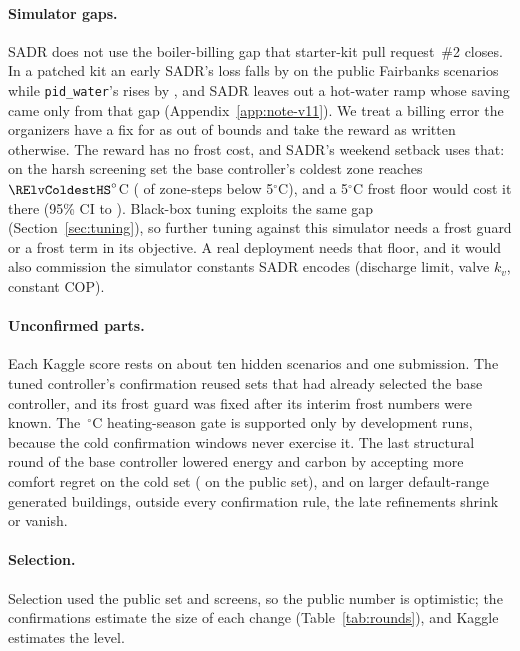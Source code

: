\paragraph{Simulator gaps.} SADR does not use the boiler-billing gap that starter-kit pull request~\#2 closes. In a patched kit an early SADR's loss falls by \RFivePrTwoVSevenRelAbs{} on the \RFivePrTwoVSevenN{} public Fairbanks scenarios while \texttt{pid\_water}'s rises by \RFivePrTwoPidRelAbs, and SADR leaves out a hot-water ramp whose saving came only from that gap (Appendix~\ref{app:note-v11}). We treat a billing error the organizers have a fix for as out of bounds and take the reward as written otherwise. The reward has no frost cost, and SADR's weekend setback uses that: on the harsh screening set the base controller's coldest zone reaches $\RElvColdestHS^\circ$C (\RElvBelowFiveHS{} of zone-steps below 5$^\circ$C), and a 5$^\circ$C frost floor would cost it \RElvFrostHsRel{} there (95\% CI \RElvFrostHsLo{} to \RElvFrostHsHi). Black-box tuning exploits the same gap (Section~\ref{sec:tuning}), so further tuning against this simulator needs a frost guard or a frost term in its objective. A real deployment needs that floor, and it would also commission the simulator constants SADR encodes (discharge limit, valve $k_v$, constant COP).

\paragraph{Unconfirmed parts.} Each Kaggle score rests on about ten hidden scenarios and one submission. The tuned controller's confirmation reused sets that had already selected the base controller, and its frost guard was fixed after its interim frost numbers were known. The \RTenSeasonOatC\,$^\circ$C heating-season gate is supported only by development runs, because the cold confirmation windows never exercise it. The last structural round of the base controller lowered energy and carbon by accepting \RTenComfRiseHCThree{} more comfort regret on the cold set (\RTenComfRisePub{} on the public set), and on larger default-range generated buildings, outside every confirmation rule, the late refinements shrink or vanish.

\paragraph{Selection.} Selection used the public set and screens, so the public number is optimistic; the confirmations estimate the size of each change (Table~\ref{tab:rounds}), and Kaggle estimates the level.

